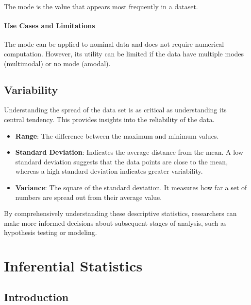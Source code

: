 \documentclass[
  b5paper]{book}
\begin{document}
The mode is the value that appears most frequently in a dataset.

\hypertarget{use-cases-and-limitations}{%
\paragraph{Use Cases and Limitations}\label{use-cases-and-limitations}}

The mode can be applied to nominal data and does not require numerical computation. However, its utility can be limited if the data have multiple modes (multimodal) or no mode (amodal).

\hypertarget{variability}{%
\subsection{Variability}\label{variability}}

Understanding the spread of the data set is as critical as understanding its central tendency. This provides insights into the reliability of the data.

\begin{itemize}
\item
  \textbf{Range}: The difference between the maximum and minimum values.
\item
  \textbf{Standard Deviation}: Indicates the average distance from the mean. A low standard deviation suggests that the data points are close to the mean, whereas a high standard deviation indicates greater variability.
\item
  \textbf{Variance}: The square of the standard deviation. It measures how far a set of numbers are spread out from their average value.
\end{itemize}

By comprehensively understanding these descriptive statistics, researchers can make more informed decisions about subsequent stages of analysis, such as hypothesis testing or modeling.

\hypertarget{inferential-statistics-1}{%
\section{Inferential Statistics}\label{inferential-statistics-1}}

\hypertarget{introduction-9}{%
\subsection{Introduction}\label{introduction-9}}
\end{document}
